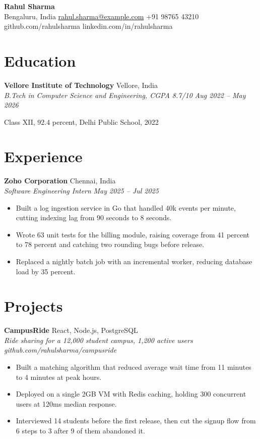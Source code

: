 \documentclass[10pt,a4paper]{article}
\newcommand{\role}[4]{%
  \textbf{#1} \hfill #2\\%
  \textit{#3} \hfill \textit{#4}\par\vspace{0.1em}%
}
\newenvironment{bullets}{%
  \begin{itemize}[leftmargin=1.05em,itemsep=0.12em,topsep=0.12em,parsep=0pt,label=\textbullet]%
}{\end{itemize}}
\begin{document}
\begin{center}
  {\LARGE\bfseries Rahul Sharma}\\[0.2em]
  \small
  Bengaluru, India \textbar{}
  \href{mailto:rahul.sharma@example.com}{rahul.sharma@example.com} \textbar{}
  +91 98765 43210 \textbar{}
  github.com/rahulsharma \textbar{}
  linkedin.com/in/rahulsharma
\end{center}

\section{Education}
\role{Vellore Institute of Technology}{Vellore, India}{B.Tech in Computer Science and Engineering, CGPA 8.7/10}{Aug 2022 -- May 2026}
Class XII, 92.4 percent, Delhi Public School, 2022

\section{Experience}
\role{Zoho Corporation}{Chennai, India}{Software Engineering Intern}{May 2025 -- Jul 2025}
\begin{bullets}
  \item Built a log ingestion service in Go that handled 40k events per minute, cutting indexing lag from 90 seconds to 8 seconds.
  \item Wrote 63 unit tests for the billing module, raising coverage from 41 percent to 78 percent and catching two rounding bugs before release.
  \item Replaced a nightly batch job with an incremental worker, reducing database load by 35 percent.
\end{bullets}

\section{Projects}
\role{CampusRide}{React, Node.js, PostgreSQL}{Ride sharing for a 12,000 student campus, 1,200 active users}{github.com/rahulsharma/campusride}
\begin{bullets}
  \item Built a matching algorithm that reduced average wait time from 11 minutes to 4 minutes at peak hours.
  \item Deployed on a single 2GB VM with Redis caching, holding 300 concurrent users at 120ms median response.
  \item Interviewed 14 students before the first release, then cut the signup flow from 6 steps to 3 after 9 of them abandoned it.
\end{bullets}
\end{document}
